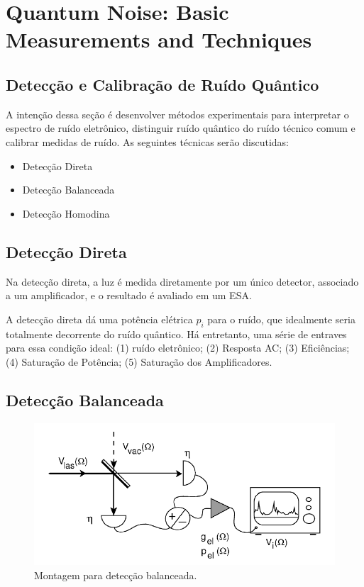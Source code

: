 
\section{Quantum Noise: Basic Measurements and Techniques}

\subsection{Detecção e Calibração de Ruído Quântico}

A intenção dessa seção é desenvolver métodos experimentais para interpretar o espectro de ruído eletrônico, distinguir ruído quântico do ruído técnico comum e calibrar medidas de ruído. As seguintes técnicas serão discutidas:

\begin{itemize}
    \item Detecção Direta
    \item Detecção Balanceada
    \item Detecção Homodina
\end{itemize}

\subsection{Detecção Direta}

Na detecção direta, a luz é medida diretamente por um único detector, associado a um amplificador, e o resultado é avaliado em um ESA.

A detecção direta dá uma potência elétrica $p_i$ para o ruído, que idealmente seria totalmente decorrente do ruído quântico. Há entretanto, uma série de entraves para essa condição ideal: (1) ruído eletrônico; (2) Resposta AC; (3) Eficiências; (4) Saturação de Potência; (5) Saturação dos Amplificadores.

\subsection{Detecção Balanceada}



\begin{figure}[H]
    \centering
    \includegraphics[width=1.0\linewidth]{balanced detection.png}
    \caption{Montagem para detecção balanceada.}
    \label{balanced.detection}
\end{figure}

